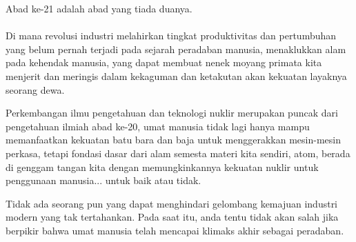 \thispagestyle{plain}

Abad ke-21 adalah abad yang tiada duanya.\\ \\Di mana revolusi industri 
melahirkan tingkat produktivitas dan pertumbuhan yang belum pernah terjadi pada sejarah peradaban manusia,
menaklukkan alam pada kehendak manusia, yang dapat membuat nenek moyang primata kita menjerit dan meringis
dalam kekaguman dan ketakutan akan kekuatan layaknya seorang dewa. 

Perkembangan ilmu pengetahuan dan teknologi nuklir merupakan puncak dari pengetahuan ilmiah abad ke-20,
umat manusia tidak lagi hanya mampu memanfaatkan kekuatan batu bara dan baja untuk menggerakkan mesin-mesin perkasa,
tetapi fondasi dasar dari alam semesta materi kita sendiri, atom, berada di genggam tangan kita dengan memungkinkannya kekuatan nuklir untuk penggunaan manusia... untuk baik atau tidak.

Tidak ada seorang pun yang dapat menghindari gelombang kemajuan industri modern yang tak tertahankan.
Pada saat itu, anda tentu tidak akan salah jika berpikir bahwa umat manusia telah mencapai klimaks akhir sebagai peradaban.



